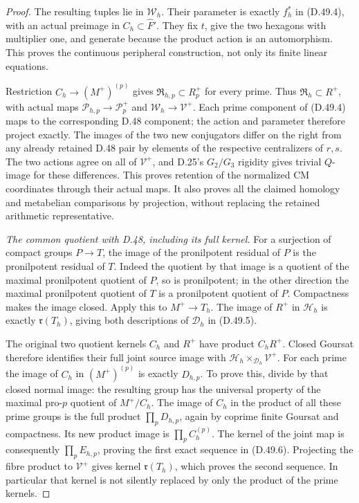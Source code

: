 \begin{proof}
The resulting tuples lie in \(\mathcal W_h\). Their
parameter is exactly \(f_h^*\) in (D.49.4), with an
actual preimage in \(C_h\subset\widehat F'\).
They fix \(t\), give the two hexagons with multiplier
one, and generate because the product action is an
automorphism. This proves the continuous peripheral
construction, not only its finite linear equations.

Restriction \(C_h\to(M^+)^{(p)}\) gives
\(\mathfrak R_{h,p}\subset R_p^+\) for every prime.
Thus \(\mathfrak R_h\subset R^+\), with actual maps
\(\mathcal P_{h,p}\to\mathcal P_p^+\) and
\(\mathcal W_h\to\mathcal V^+\). Each prime component
of (D.49.4) maps to the corresponding D.48 component;
the action and parameter therefore project exactly.
The images of the two new conjugators differ on the
right from any already retained D.48 pair by elements
of the respective centralizers of \(r,s\).
The two actions agree on all of \(\mathcal V^+\),
and D.25's \(G_2/G_3\) rigidity gives trivial \(Q\)-image
for these differences. This proves retention of the
normalized CM coordinates through their actual maps.
It also proves all the claimed homology and metabelian
comparisons by projection, without replacing the
retained arithmetic representative.

\emph{The common quotient with D.48, including its full kernel.}
For a surjection of compact groups \(P\to T\), the
image of the pronilpotent residual of \(P\) is the
pronilpotent residual of \(T\). Indeed the quotient
by that image is a quotient of the maximal
pronilpotent quotient of \(P\), so is pronilpotent;
in the other direction the maximal pronilpotent
quotient of \(T\) is a pronilpotent quotient of
\(P\). Compactness makes the image closed.
Apply this to \(M^+\to T_h\). The image of
\(R^+\) in \(\mathcal H_h\) is exactly
\(\mathfrak r(T_h)\), giving both descriptions of
\(\mathcal D_h\) in (D.49.5).

The original two quotient kernels \(C_h\) and
\(R^+\) have product \(C_hR^+\). Closed Goursat
therefore identifies their full joint source image
with \(\mathcal H_h\times_{\mathcal D_h}\mathcal V^+\).
For each prime the image of \(C_h\) in
\((M^+)^{(p)}\) is exactly \(D_{h,p}\).
To prove this, divide by that closed normal image:
the resulting group has the universal property of
the maximal pro-\(p\) quotient of \(M^+/C_h\).
The image of \(C_h\) in the product of all these
prime groups is the full product \(\prod_pD_{h,p}\),
again by coprime finite Goursat and compactness.
Its new product image is \(\prod_pC_h^{(p)}\).
The kernel of the joint map is consequently
\(\prod_pE_{h,p}\), proving the first exact sequence
in (D.49.6). Projecting the fibre product to
\(\mathcal V^+\) gives kernel
\(\mathfrak r(T_h)\), which proves the second
sequence. In particular that kernel is not silently
replaced by only the product of the prime kernels.


\end{proof}
